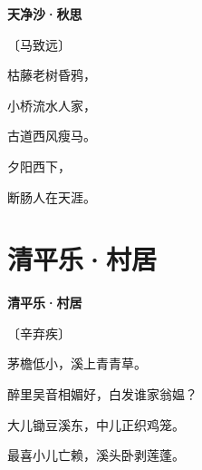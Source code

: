 \documentclass[12pt,UTF-8,openany,fontset=none]{ctexbook}
\begin{document}
\begin{center}
    {\bfseries 天净沙·秋思}

    \vspace{18pt}

    \begin{large}\xuwen
        〔马致远〕
    \end{large}

\end{center}

    \vspace{18pt}  %

\begin{center}
    \begin{Large}

        枯藤老树昏鸦，

        小桥流水人家，

        古道西风瘦马。

        夕阳西下，\hspace{25pt}

        断肠人在天涯。

    \end{Large}

\end{center}

\vspace{8pt}
\clearpage

\section{清平乐·村居}


\begin{center}
    {\bfseries 清平乐·村居}

    \vspace{18pt}

    \begin{large}\xuwen
        〔辛弃疾〕
    \end{large}

\end{center}

    \vspace{18pt}  %

\begin{center}
    \begin{Large}

        茅檐低小，溪上青青草。

        醉里吴音相媚好，白发谁家翁媪？

        \vspace{18pt}  %

        大儿锄豆溪东，中儿正织鸡笼。

        最喜小儿亡赖，溪头卧剥莲蓬。

    \end{Large}

\end{center}
\end{document}

